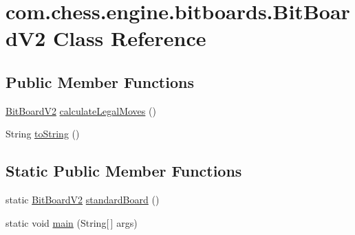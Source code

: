 \hypertarget{classcom_1_1chess_1_1engine_1_1bitboards_1_1_bit_board_v2}{}\section{com.\+chess.\+engine.\+bitboards.\+Bit\+Board\+V2 Class Reference}
\label{classcom_1_1chess_1_1engine_1_1bitboards_1_1_bit_board_v2}
\subsection*{Public Member Functions}
\begin{DoxyCompactItemize}
\item 
\mbox{\hyperlink{classcom_1_1chess_1_1engine_1_1bitboards_1_1_bit_board_v2}{Bit\+Board\+V2}} \mbox{\hyperlink{classcom_1_1chess_1_1engine_1_1bitboards_1_1_bit_board_v2_ad2321f258a3cbbf4b1d9a185e918cb17}{calculate\+Legal\+Moves}} ()
\item 
String \mbox{\hyperlink{classcom_1_1chess_1_1engine_1_1bitboards_1_1_bit_board_v2_a2be25c4eb97273a748c5502ad3eeee4f}{to\+String}} ()
\end{DoxyCompactItemize}
\subsection*{Static Public Member Functions}
\begin{DoxyCompactItemize}
\item 
static \mbox{\hyperlink{classcom_1_1chess_1_1engine_1_1bitboards_1_1_bit_board_v2}{Bit\+Board\+V2}} \mbox{\hyperlink{classcom_1_1chess_1_1engine_1_1bitboards_1_1_bit_board_v2_a632bd030fc04c57fb620970712f9badc}{standard\+Board}} ()
\item 
static void \mbox{\hyperlink{classcom_1_1chess_1_1engine_1_1bitboards_1_1_bit_board_v2_aa5cc2fa40331f1e25e1dec3bc62376b2}{main}} (String\mbox{[}$\,$\mbox{]} args)
\end{DoxyCompactItemize}
